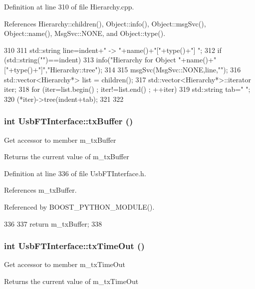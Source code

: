 Definition at line 310 of file Hierarchy.cpp.

References Hierarchy::children(), Object::info(), Object::msgSvc(), Object::name(), MsgSvc::NONE, and Object::type().


\begin{DoxyCode}
310                                     {
311   std::string line=indent+" -> "+name()+"["+type()+"] ";
312   if (std::string("")==indent){
313     info("Hierarchy for Object "+name()+"["+type()+"]","Hierarchy::tree");
314   }
315   msgSvc(MsgSvc::NONE,line,"");
316   std::vector<Hierarchy*> list = children();
317   std::vector<Hierarchy*>::iterator iter;
318   for (iter=list.begin() ; iter!=list.end() ; ++iter){
319     std::string tab="  ";
320     (*iter)->tree(indent+tab);
321   }
322 }
\end{DoxyCode}
\hypertarget{classUsbFTInterface_acac73d3fc1587437656bb7fe24e10906}{
\subsubsection[{txBuffer}]{\setlength{\rightskip}{0pt plus 5cm}int UsbFTInterface::txBuffer ()}}
\label{classUsbFTInterface_acac73d3fc1587437656bb7fe24e10906}
Get accessor to member m\_\-txBuffer \begin{DoxyReturn}{Returns}
the current value of m\_\-txBuffer 
\end{DoxyReturn}


Definition at line 336 of file UsbFTInterface.h.

References m\_\-txBuffer.

Referenced by BOOST\_\-PYTHON\_\-MODULE().


\begin{DoxyCode}
336                   {
337     return m_txBuffer;
338   }
\end{DoxyCode}
\hypertarget{classUsbFTInterface_acab2397cb42003a1ed8f69a0c6cae195}{
\subsubsection[{txTimeOut}]{\setlength{\rightskip}{0pt plus 5cm}int UsbFTInterface::txTimeOut ()}}
\label{classUsbFTInterface_acab2397cb42003a1ed8f69a0c6cae195}
Get accessor to member m\_\-txTimeOut \begin{DoxyReturn}{Returns}
the current value of m\_\-txTimeOut 
\end{DoxyReturn}


